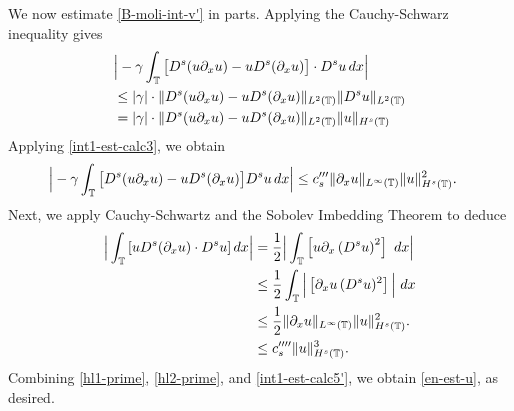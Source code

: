 %
%
%
We now estimate \eqref{B-moli-int-v'} in parts. Applying the Cauchy-Schwarz inequality gives
%
\begin{equation*} 
\begin{split}
& \Big|
- \gamma \int_{\mathbb{T}}
\big[ 
D^s(u\partial_x u)  -  u D^s (\partial_xu)
\big] \cdot
D^s u   \, dx
\Big|
\\
& \le
|\gamma| \cdot \|
D^s(u\partial_x u)  -  u D^s (\partial_xu)
\|_{L^2(\mathbb{T})}
\|
D^s u 
\|_{L^2(\mathbb{T})}
\\
& =
|\gamma| \cdot \| D^s(u\partial_x u)  -  u D^s (\partial_xu)
\|_{L^2(\mathbb{T})}
\|
u
\|_{H^s(\mathbb{T})}
\end{split}
\end{equation*}
Applying \eqref{int1-est-calc3}, we obtain
\begin{equation*}
\begin{split}
\Big|
- \gamma \int_{\mathbb{T}}
\big[ 
D^s(u\partial_x u)  -  u D^s (\partial_xu)
\big]
D^s u   \, dx
\Big|
&\le
c_s'''   \| \partial_x u \|_{L^\infty(\mathbb{T})} 
\| u \|_{H^s(\mathbb{T})}^2.
\end{split}
\end{equation*}
%
Next, we apply Cauchy-Schwartz and the Sobolev Imbedding Theorem to deduce 
%
%
%
\begin{equation} 
\label{int1-est-calc5'}
\begin{split}
\Big|
\int_{\mathbb{T}}
\left [u D^s (\partial_x u)
\cdot  D^s u \right ] dx
\Big|
& =
\frac{1}{2} \Big|
\int_{\mathbb{T}}
\left [u \partial_x\left(D^s u\right)^2 \right ] \ dx
\Big|
\\
& \le
\frac{1}{2} \int_{\mathbb{T}} \Big |
\left [\partial_x u \, (D^s u)^2  \right ] 
\Big| \ dx
\\
& \le
\frac{1}{2}
\| \partial_x u \|_{L^\infty(\mathbb{T})} 
\| u \|_{H^s(\mathbb{T})}^2.
\\
& \le c_s'''' \|u\|_{H^s(\mathbb{T})}^3.
\end{split}
\end{equation}
%
%
%
Combining \eqref{hl1-prime}, \eqref{hl2-prime},
and \eqref{int1-est-calc5'}, we obtain \eqref{en-est-u}, as desired.
